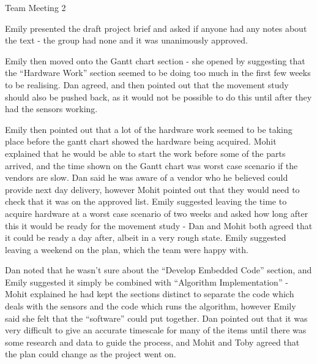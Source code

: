 \documentclass{article}
\begin{document}

\begin{Minutes}{Team Meeting 2}
\maketitle


Emily presented the draft project brief and asked if anyone had any notes about the text -
the group had none and it was unanimously approved.

Emily then moved onto the Gantt chart section - she opened by suggesting that the ``Hardware Work''
section seemed to be doing too much in the first few weeks to be realising. Dan agreed, and then pointed
out that the movement study should also be pushed back, as it would not be possible to do this until
after they had the sensors working.

Emily then pointed out that a lot of the hardware work seemed to be
taking place before the gantt chart showed the hardware being acquired. Mohit explained that he would be
able to start the work before some of the parts arrived, and the time shown on the Gantt chart was
worst case scenario if the vendors are slow. Dan said he was aware of a vendor who he believed could
provide next day delivery, however Mohit pointed out that they would need to check that it was on the
approved list. Emily suggested leaving the time to acquire hardware at a worst case scenario of two weeks
and asked how long after this it would be ready for the movement study - Dan and Mohit both agreed that
it could be ready a day after, albeit in a very rough state. Emily suggested leaving a weekend on the
plan, which the team were happy with.

Dan noted that he wasn't sure about the ``Develop Embedded Code'' section, and Emily suggested it simply
be combined with ``Algorithm Implementation'' - Mohit explained he had kept the sections distinct to
separate the code which deals with the sensors and the code which runs the algorithm, however Emily said
she felt that the ``software'' could put together. Dan pointed out that it was very difficult to give
an accurate timescale for many of the items until there was some research and data to guide the process, and
Mohit and Toby agreed that the plan could change as the project went on.


\end{Minutes}
\end{document}
